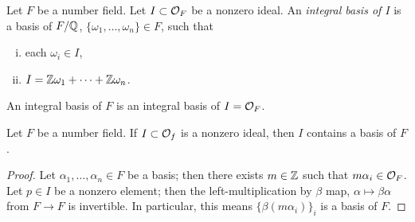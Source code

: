 \begin{definition} \label{defn:integral_basis}
    Let $F$ be a number field. Let $I \subset \mathcal O_F$ be a nonzero ideal. An \textit{integral basis of $I$} is a basis of $F/\mathbb Q$, $\{\omega_1, \dots, \omega_n\} \in F$, such that
    \begin{enumerate}[(i)]
        \item each $\omega_i \in I$,
        \item $I = \mathbb Z\omega_1 + \dots + \mathbb Z \omega_n$.
    \end{enumerate}
    An integral basis of $F$ is an integral basis of $I = \mathcal O_F$.
\end{definition}

\begin{lemma} \label{lem:ideal_contains_basis}
    Let $F$ be a number field. If $I \subset \mathcal O_f$ is a nonzero ideal, then $I$ contains a basis of $F$.
\end{lemma}
\begin{proof}
    Let $\alpha_1, \dots, \alpha_n \in F$ be a basis; then there exists $m \in \mathbb Z$ such that $m \alpha_i \in \mathcal O_F$. Let $p \in I$ be a nonzero element; then the left-multiplication by $\beta$ map, $\alpha \mapsto \beta\alpha$ from $F \to F$ is invertible. In particular, this means $\{\beta (m \alpha_i)\}_i$ is a basis of $F$.
\end{proof}

